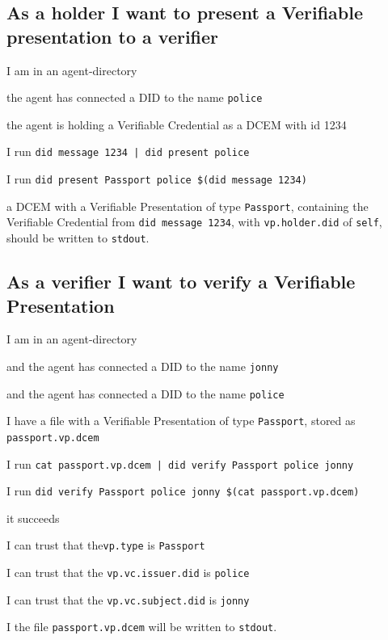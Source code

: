 \subsection{As a holder I want to present a Verifiable presentation to a verifier}
\begin{description}[1.35cm]
    \item[Given] I am in an agent-directory
    \item[and] the agent has connected a DID to the name \texttt{police}
    \item[and] the agent is holding a Verifiable Credential as a DCEM with id 1234
    \item[When] I run \texttt{did message 1234 | did present police}
    \item[or] I run \texttt{did present Passport police \$(did message 1234)}
    \item[Then] a DCEM with a Verifiable Presentation of type \texttt{Passport}, containing the Verifiable Credential from \texttt{did message 1234}, with \texttt{vp.holder.did} of \texttt{self}, should be written to \texttt{stdout}.
\end{description}



\subsection{As a verifier I want to verify a Verifiable Presentation}
\begin{description}[1.35cm]
    \item[Given] I am in an agent-directory
    \item[and] and the agent has connected a DID to the name \texttt{jonny}
    \item[and] and the agent has connected a DID to the name \texttt{police}
    \item[and] I have a file with a Verifiable Presentation of type \texttt{Passport}, stored as \texttt{passport.vp.dcem}
    \item[When] I run \texttt{cat passport.vp.dcem | did verify Passport police jonny}
    \item[or] I run \texttt{did verify Passport police jonny \$(cat passport.vp.dcem)}
    \item[and] it succeeds
    \item[And] I can trust that the\texttt{vp.type} is \texttt{Passport}
    \item[Then] I can trust that the \texttt{vp.vc.issuer.did} is \texttt{police}
    \item[And] I can trust that the \texttt{vp.vc.subject.did} is \texttt{jonny}
    \item[And] I the file \texttt{passport.vp.dcem} will be written to \texttt{stdout}.
\end{description}



